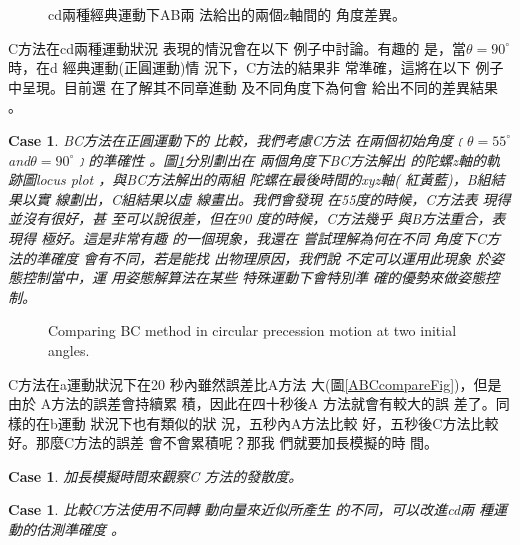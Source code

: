 \documentclass[12pt,twoside]{article}
\newtheorem{case}[theorem]{Case}
\begin{document}
\begin{figure}[th]
\caption{cd兩種經典運動下AB兩%
法給出的兩個z軸間的%
角度差異。}
\begin{center}
\frame{}
\end{center}
\end{figure}

C方法在cd兩種運動狀況%
表現的情況會在以下%
例子中討論。有趣的%
是，當$\theta =90^{\circ }$時，在d%
經典運動(正圓運動)情%
況下，C方法的結果非%
常準確，這將在以下%
例子中呈現。目前還%
在了解其不同章進動%
及不同角度下為何會%
給出不同的差異結果%
。

\begin{case}
BC方法在正圓運動下的%
比較，我們考慮C方法%
在兩個初始角度﹝$\theta
=55^{\circ }$and$\theta =90^{\circ }$﹞的準確性%
。圖\ref{BC_d_5590}分別劃出在%
兩個角度下BC方法解出%
的陀螺z軸的軌跡圖locus plot%
，與BC方法解出的兩組%
陀螺在最後時間的xyz軸(%
紅黃藍)，B組結果以實%
線劃出，C組結果以虛%
線畫出。我們會發現%
在55度的時候，C方法表%
現得並沒有很好，甚%
至可以說很差，但在90%
度的時候，C方法幾乎%
與B方法重合，表現得%
極好。這是非常有趣%
的一個現象，我還在%
嘗試理解為何在不同%
角度下C方法的準確度%
會有不同，若是能找%
出物理原因，我們說%
不定可以運用此現象%
於姿態控制當中，運%
用姿態解算法在某些%
特殊運動下會特別準%
確的優勢來做姿態控%
制。
\end{case}

\begin{figure}[th]
\caption{Comparing BC method in circular precession motion at two initial
angles.}
\label{BC_d_5590}
\begin{center}

\end{center}
\end{figure}

C方法在a運動狀況下在20%
秒內雖然誤差比A方法%
大(圖\ref{ABCcompareFig})，但是由於%
A方法的誤差會持續累%
積，因此在四十秒後A%
方法就會有較大的誤%
差了。同樣的在b運動%
狀況下也有類似的狀%
況，五秒內A方法比較%
好，五秒後C方法比較%
好。那麼C方法的誤差%
會不會累積呢？那我%
們就要加長模擬的時%
間。

\begin{case}
加長模擬時間來觀察C%
方法的發散度。
\end{case}

\begin{case}
比較C方法使用不同轉%
動向量來近似所產生%
的不同，可以改進cd兩%
種運動的估測準確度%
。
\end{case}
\end{document}
